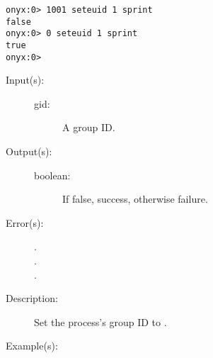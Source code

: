 \begin{description}
\begin{description}
\begin{verbatim}
onyx:0> 1001 seteuid 1 sprint
false
onyx:0> 0 seteuid 1 sprint
true
onyx:0>
		\end{verbatim}
	\end{description}
\label{systemdict:setgid}
\item[{\onyxop{gid}{setgid}{boolean}}: ]
	\begin{description}\item[]
	\item[Input(s): ]
		\begin{description}\item[]
		\item[gid: ]
			A group ID.
		\end{description}
	\item[Output(s): ]
		\begin{description}\item[]
		\item[boolean: ]
			If false, success, otherwise failure.
		\end{description}
	\item[Error(s): ]
		\begin{description}\item[]
		\item[.]
		\item[.]
		\item[.]
		\end{description}
	\item[Description: ]
		Set the process's group ID to .
	\item[Example(s): ]\begin{verbatim}


\end{verbatim}
\end{description}
\end{description}
